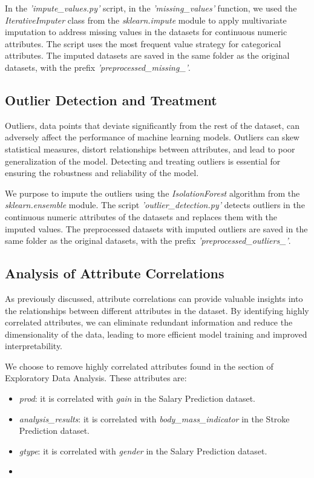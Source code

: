 \documentclass[runningheads]{paper}
\begin{document}
In the \textit{'impute\_values.py'} script, in the \textit{'missing\_values'} function,
we used the \textit{IterativeImputer}
class from the \textit{sklearn.impute} module to apply multivariate imputation to
address missing values in the datasets for continuous numeric attributes. The script
uses the most frequent value strategy for categorical attributes. The imputed datasets
are saved in the same folder as the original datasets, with the prefix
\textit{'preprocessed\_missing\_'}.

\subsection{Outlier Detection and Treatment}
Outliers, data points that deviate significantly from the rest of the dataset,
can adversely affect the performance of machine learning models. Outliers can
skew statistical measures, distort relationships between attributes, and lead to
poor generalization of the model. Detecting and treating outliers is essential
for ensuring the robustness and reliability of the model.

We purpose to impute the outliers using the \textit{IsolationForest} algorithm
from the \textit{sklearn.ensemble} module. The script \textit{'outlier\_detection.py'}
detects outliers in the continuous numeric attributes of the datasets and replaces
them with the imputed values. The preprocessed datasets with imputed outliers are
saved in the same folder as the original datasets, with the prefix
\textit{'preprocessed\_outliers\_'}.

\subsection{Analysis of Attribute Correlations}
As previously discussed, attribute correlations can provide valuable insights
into the relationships between different attributes in the dataset. By identifying
highly correlated attributes, we can eliminate redundant information and reduce
the dimensionality of the data, leading to more efficient model training and
improved interpretability.

We choose to remove highly correlated attributes found in the section of
Exploratory Data Analysis. These attributes are:

\begin{itemize}
    \item \textit{prod}: it is correlated with \textit{gain} in the Salary Prediction dataset.
    \item \textit{analysis\_results}: it is correlated with \textit{body\_mass\_indicator} in the Stroke Prediction dataset.
    \item \textit{gtype}: it is correlated with \textit{gender} in the Salary Prediction dataset.
    \item 
\end{itemize}
\end{document}
